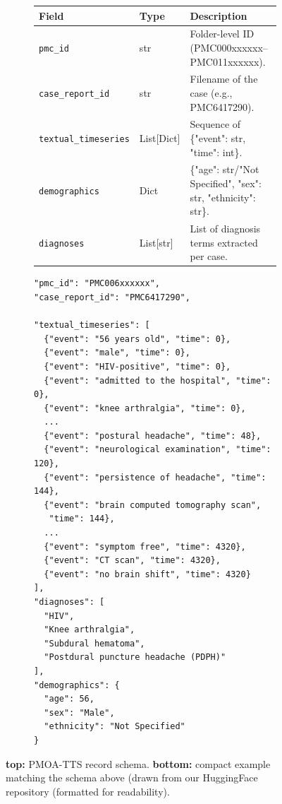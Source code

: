 \begin{figure}[t]
\centering

\begin{subfigure}[!]{1\textwidth}
\centering
\footnotesize
\begin{tabular}{@{} l l p{4cm} @{}}
\toprule
\textbf{Field} & \textbf{Type} & \textbf{Description} \\
\midrule
\texttt{pmc\_id} & str &
Folder-level ID (PMC000xxxxxx--PMC011xxxxxx). \\

\texttt{case\_report\_id} & str &
Filename of the case (e.g., PMC6417290). \\

\texttt{textual\_timeseries} & List[Dict] &
Sequence of \{"event": str, "time": int\}. \\

\texttt{demographics} & Dict &
\{"age": str/"Not Specified", "sex": str, "ethnicity": str\}. \\

\texttt{diagnoses} & List[str] &
List of diagnosis terms extracted per case. \\

\bottomrule
\end{tabular}
\end{subfigure}
\hfill

\begin{subfigure}[t]{0.65\textwidth}
\centering
\begin{tcolorbox}[
  colback=gray!5,
  colframe=gray!70,
  title=Example JSON entry,
  boxrule=1pt,
  enhanced,
  fontupper=\footnotesize
]
\begin{verbatim}
"pmc_id": "PMC006xxxxxx",
"case_report_id": "PMC6417290",

"textual_timeseries": [
  {"event": "56 years old", "time": 0},
  {"event": "male", "time": 0},
  {"event": "HIV-positive", "time": 0},
  {"event": "admitted to the hospital", "time": 0},
  {"event": "knee arthralgia", "time": 0},
  ...
  {"event": "postural headache", "time": 48},
  {"event": "neurological examination", "time": 120},
  {"event": "persistence of headache", "time": 144},
  {"event": "brain computed tomography scan",
   "time": 144},
  ...
  {"event": "symptom free", "time": 4320},
  {"event": "CT scan", "time": 4320},
  {"event": "no brain shift", "time": 4320}
],
"diagnoses": [
  "HIV",
  "Knee arthralgia",
  "Subdural hematoma",
  "Postdural puncture headache (PDPH)"
],
"demographics": {
  "age": 56,
  "sex": "Male",
  "ethnicity": "Not Specified"
}
\end{verbatim}
\end{tcolorbox}
\end{subfigure}

\caption{\textbf{top:} PMOA-TTS record schema. \textbf{bottom:} compact example matching the schema above (drawn from our HuggingFace repository (formatted for readability).}
\label{fig:record_schema}
\vspace{-3mm}
\end{figure}
